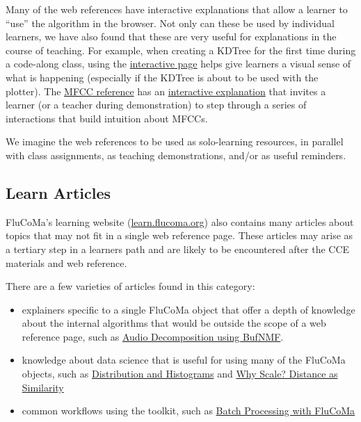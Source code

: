 \documentclass{article}
\providecommand{\tightlist}{%
  \setlength{\itemsep}{0pt}\setlength{\parskip}{0pt}}
\begin{document}
Many of the web references have interactive explanations that allow a
learner to ``use'' the algorithm in the browser. Not only can these be
used by individual learners, we have also found that these are very
useful for explanations in the course of teaching. For example, when
creating a KDTree for the first time during a code-along class, using
the \href{https://learn.flucoma.org/reference/kdtree/}{interactive page}
helps give learners a visual sense of what is happening (especially if
the KDTree is about to be used with the plotter). The
\href{https://learn.flucoma.org/reference/mfcc/}{MFCC reference} has an
\href{https://learn.flucoma.org/reference/mfcc/explain/}{interactive
explanation} that invites a learner (or a teacher during demonstration)
to step through a series of interactions that build intuition about
MFCCs.

We imagine the web references to be used as solo-learning resources, in
parallel with class assignments, as teaching demonstrations, and/or as
useful reminders.

\subsection{Learn Articles}\label{learn-articles}

FluCoMa's learning website
(\href{https://learn.flucoma.org}{learn.flucoma.org}) also contains many
articles about topics that may not fit in a single web reference page.
These articles may arise as a tertiary step in a learners path and are
likely to be encountered after the CCE materials and web reference.

There are a few varieties of articles found in this category:

\begin{itemize}
\tightlist
\item
  explainers specific to a single FluCoMa object that offer a depth of
  knowledge about the internal algorithms that would be outside the
  scope of a web reference page, such as
  \href{https://learn.flucoma.org/learn/bufnmf/}{Audio Decomposition
  using BufNMF}.
\item
  knowledge about data science that is useful for using many of the
  FluCoMa objects, such as
  \href{https://learn.flucoma.org/learn/distribution/}{Distribution and
  Histograms} and \href{https://learn.flucoma.org/learn/why-scale/}{Why
  Scale? Distance as Similarity}
\item
  common workflows using the toolkit, such as
  \href{https://learn.flucoma.org/learn/batch-processing/}{Batch
  Processing with FluCoMa}
\end{itemize}
\end{document}
